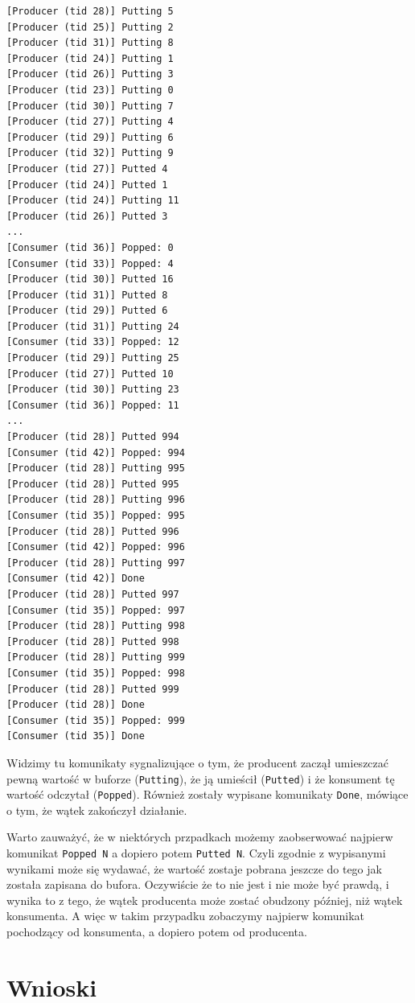 \documentclass[11pt]{article}
\begin{document}
\begin{verbatim}
[Producer (tid 28)] Putting 5
[Producer (tid 25)] Putting 2
[Producer (tid 31)] Putting 8
[Producer (tid 24)] Putting 1
[Producer (tid 26)] Putting 3
[Producer (tid 23)] Putting 0
[Producer (tid 30)] Putting 7
[Producer (tid 27)] Putting 4
[Producer (tid 29)] Putting 6
[Producer (tid 32)] Putting 9
[Producer (tid 27)] Putted 4
[Producer (tid 24)] Putted 1
[Producer (tid 24)] Putting 11
[Producer (tid 26)] Putted 3
...
[Consumer (tid 36)] Popped: 0
[Consumer (tid 33)] Popped: 4
[Producer (tid 30)] Putted 16
[Producer (tid 31)] Putted 8
[Producer (tid 29)] Putted 6
[Producer (tid 31)] Putting 24
[Consumer (tid 33)] Popped: 12
[Producer (tid 29)] Putting 25
[Producer (tid 27)] Putted 10
[Producer (tid 30)] Putting 23
[Consumer (tid 36)] Popped: 11
...
[Producer (tid 28)] Putted 994
[Consumer (tid 42)] Popped: 994
[Producer (tid 28)] Putting 995
[Producer (tid 28)] Putted 995
[Producer (tid 28)] Putting 996
[Consumer (tid 35)] Popped: 995
[Producer (tid 28)] Putted 996
[Consumer (tid 42)] Popped: 996
[Producer (tid 28)] Putting 997
[Consumer (tid 42)] Done
[Producer (tid 28)] Putted 997
[Consumer (tid 35)] Popped: 997
[Producer (tid 28)] Putting 998
[Producer (tid 28)] Putted 998
[Producer (tid 28)] Putting 999
[Consumer (tid 35)] Popped: 998
[Producer (tid 28)] Putted 999
[Producer (tid 28)] Done
[Consumer (tid 35)] Popped: 999
[Consumer (tid 35)] Done
\end{verbatim}

Widzimy tu komunikaty sygnalizujące o tym, że producent zaczął
umieszczać pewną wartość w buforze (\texttt{Putting}), że ją umieścił
(\texttt{Putted}) i że konsument tę wartość odczytał (\texttt{Popped}).
Również zostały wypisane komunikaty \texttt{Done}, mówiące o tym, że
wątek zakończył działanie.

Warto zauważyć, że w niektórych przpadkach możemy zaobserwować najpierw
komunikat \texttt{Popped\ N} a dopiero potem \texttt{Putted\ N}. Czyli
zgodnie z wypisanymi wynikami może się wydawać, że wartość zostaje
pobrana jeszcze do tego jak została zapisana do bufora. Oczywiście że to
nie jest i nie może być prawdą, i wynika to z tego, że wątek producenta
może zostać obudzony później, niż wątek konsumenta. A więc w takim
przypadku zobaczymy najpierw komunikat pochodzący od konsumenta, a
dopiero potem od producenta.

    \hypertarget{wnioski}{%
\section{Wnioski}\label{wnioski}}
\end{document}
